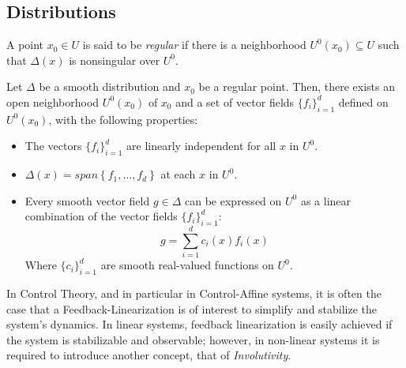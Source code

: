                     \subsection{Distributions}
                        A point $x_0 \in U$ is said to be \textit{regular} if there is a neighborhood $U^0(x_0)\subseteq U$ such that $\Delta(x)$ is nonsingular over $U^0$.
                        \begin{lemma}\label{smoot_distributions}
                            Let $\Delta$ be a smooth distribution and $x_0$ be a regular point. Then, there exists an open neighborhood $U^0(x_0)$ of $x_0$ and a set of vector fields $\{f_i\}_{i=1}^{d}$ defined on $U^0(x_0)$, with the following properties:
                            \begin{itemize}
                                \item The vectors $\{f_i\}_{i=1}^{d}$ are linearly independent for all $x$ in $U^0$.
                                \item $\Delta(x)=span\left\{f_1,\dots,f_d\right\}$ at each $x$ in $U^0$.
                                \item Every smooth vector field $g \in \Delta$ can be expressed on $U^0$ as a linear combination of the vector fields $\{f_i\}_{i=1}^{d}$:
                                \begin{equation*}
                                    g=\sum_{i=1}^{d}c_i(x)f_i(x)
                                \end{equation*}
                                Where $\{c_i\}_{i=1}^{d}$ are smooth real-valued functions on $U^0$.
                            \end{itemize}
                        \end{lemma}
                        In Control Theory, and in particular in Control-Affine systems, it is often the case that a Feedback-Linearization is of interest to simplify and stabilize the system's dynamics. In linear systems, feedback linearization is easily achieved if the system is stabilizable and observable; however, in non-linear systems it is required to introduce another concept, that of \textit{Involutivity}.
